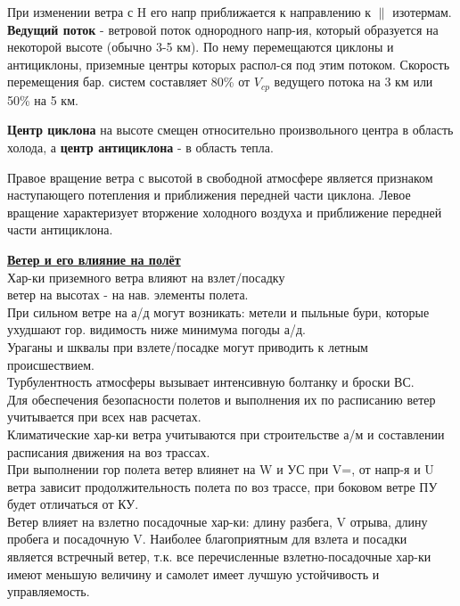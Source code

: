 \par При изменении ветра с H его напр приближается к направлению к $\parallel$ изотермам.\\
\textbf{Ведущий поток} - ветровой поток однородного напр-ия, который образуется на некоторой высоте (обычно 3-5 км). По нему перемещаются циклоны и антициклоны, приземные центры которых распол-ся под этим потоком. Скорость перемещения бар. систем составляет 80\% от $V_{cp}$ ведущего потока на 3 км или 50\% на 5 км.
\par \textbf{Центр циклона} на высоте смещен относительно произвольного центра в область холода, а \textbf{центр антициклона} - в область тепла.
\par Правое вращение ветра с высотой в свободной атмосфере является признаком наступающего потепления и приближения передней части циклона. Левое вращение характеризует вторжение холодного воздуха и приближение передней части антициклона.

\par \underline{\textbf{Ветер и его влияние на полёт}}\\
Хар-ки приземного ветра влияют на взлет/посадку\\
ветер на высотах - на нав. элементы полета.\\
При сильном ветре на а/д могут возникать: метели и пыльные бури, которые ухудшают гор. видимость ниже минимума погоды а/д.\\
Ураганы и шквалы при взлете/посадке могут приводить к летным происшествием.\\
Турбулентность атмосферы вызывает интенсивную болтанку и броски ВС.\\
Для обеспечения безопасности полетов и выполнения их по расписанию ветер учитывается при всех нав расчетах.\\
Климатические хар-ки ветра учитываются при строительстве а/м и составлении расписания движения на воз трассах.\\ 
При выполнении гор полета ветер влиянет на W и УС при V=, от напр-я и U ветра зависит продолжительность полета по воз трассе, при боковом ветре ПУ будет отличаться от КУ.\\
Ветер влияет на взлетно посадочные хар-ки: длину разбега, V отрыва, длину пробега и посадочную V. Наиболее благоприятным для взлета и посадки является встречный ветер, т.к. все перечисленные взлетно-посадочные хар-ки имеют меньшую величину и самолет имеет лучшую устойчивость и управляемость.